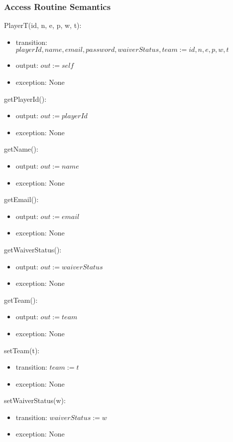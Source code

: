 \documentclass[12pt, titlepage]{article}
\begin{document}
\begin{itemize}
\subsubsection{Access Routine Semantics}

\noindent PlayerT(id, n, e, p, w, t):
\begin{itemize}
  \item transition: $playerId, name, email, password, waiverStatus, team := id, n, e, p, w, t$
  \item output: $out := self$
  \item exception: None
\end{itemize}

\noindent getPlayerId():
\begin{itemize}
  \item output: $out := playerId$
  \item exception: None
\end{itemize}

\noindent getName():
\begin{itemize}
  \item output: $out := name$
  \item exception: None
\end{itemize}

\noindent getEmail():
\begin{itemize}
  \item output: $out := email$
  \item exception: None
\end{itemize}

\noindent getWaiverStatus():
\begin{itemize}
  \item output: $out := waiverStatus$
  \item exception: None
\end{itemize}

\noindent getTeam():
\begin{itemize}
  \item output: $out := team$
  \item exception: None
\end{itemize}

\noindent setTeam(t):
\begin{itemize}
  \item transition: $team := t$
  \item exception: None
\end{itemize}

\noindent setWaiverStatus(w):
\begin{itemize}
  \item transition: $waiverStatus := w$
  \item exception: None
\end{itemize}



\end{itemize}
\end{document}
